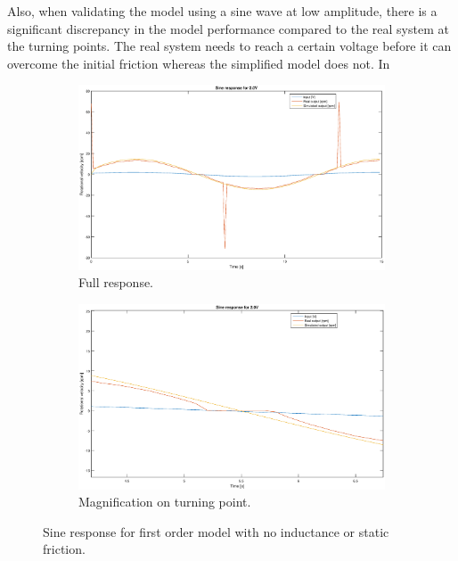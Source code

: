 Also, when validating the model using a sine wave at low amplitude, there is a
significant discrepancy in the model performance compared to the real system at
the turning points. The real system needs to reach a certain voltage before it
can overcome the initial friction whereas the simplified model does not. In 
\begin{figure}[H]
    \centering
    \begin{subfigure}[H]{0.48\textwidth}
    \label{fig:1storder_sine2}
    \includegraphics[width=\textwidth]{./img/testrig_2Vsine_no_i_no_fric.eps}
    \caption{Full response.}
    \end{subfigure}
    \begin{subfigure}[H]{0.48\textwidth}
    \label{fig:1storder_sine2z}
    \includegraphics[width=\textwidth]{./img/testrig_2Vsine_no_i_no_fric_zoom.eps}
    \caption{Magnification on turning point.}
    \end{subfigure}
    \caption{Sine response for first order model with no inductance or static
    friction.}
\end{figure}




